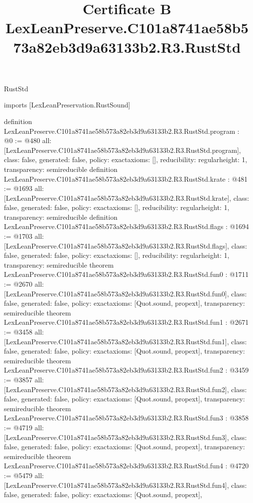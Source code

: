 \begin{lexlean}{RustStd}
\title{Certificate B LexLeanPreserve.C101a8741ae58b573a82eb3d9a63133b2.R3.RustStd}
\begin{coremodule}
imports [LexLeanPreservation.RustSound]

definition LexLeanPreserve.C101a8741ae58b573a82eb3d9a63133b2.R3.RustStd.program : @0 := @480 {
  all: [LexLeanPreserve.C101a8741ae58b573a82eb3d9a63133b2.R3.RustStd.program],
  class: false,
  generated: false,
  policy: exact{axioms: []},
  reducibility: regular{height: 1},
  transparency: semireducible
}
definition LexLeanPreserve.C101a8741ae58b573a82eb3d9a63133b2.R3.RustStd.krate : @481 := @1693 {
  all: [LexLeanPreserve.C101a8741ae58b573a82eb3d9a63133b2.R3.RustStd.krate],
  class: false,
  generated: false,
  policy: exact{axioms: []},
  reducibility: regular{height: 1},
  transparency: semireducible
}
definition LexLeanPreserve.C101a8741ae58b573a82eb3d9a63133b2.R3.RustStd.flags : @1694 := @1703 {
  all: [LexLeanPreserve.C101a8741ae58b573a82eb3d9a63133b2.R3.RustStd.flags],
  class: false,
  generated: false,
  policy: exact{axioms: []},
  reducibility: regular{height: 1},
  transparency: semireducible
}
theorem LexLeanPreserve.C101a8741ae58b573a82eb3d9a63133b2.R3.RustStd.fun0 : @1711 := @2670 {
  all: [LexLeanPreserve.C101a8741ae58b573a82eb3d9a63133b2.R3.RustStd.fun0],
  class: false,
  generated: false,
  policy: exact{axioms: [Quot.sound, propext]},
  transparency: semireducible
}
theorem LexLeanPreserve.C101a8741ae58b573a82eb3d9a63133b2.R3.RustStd.fun1 : @2671 := @3458 {
  all: [LexLeanPreserve.C101a8741ae58b573a82eb3d9a63133b2.R3.RustStd.fun1],
  class: false,
  generated: false,
  policy: exact{axioms: [Quot.sound, propext]},
  transparency: semireducible
}
theorem LexLeanPreserve.C101a8741ae58b573a82eb3d9a63133b2.R3.RustStd.fun2 : @3459 := @3857 {
  all: [LexLeanPreserve.C101a8741ae58b573a82eb3d9a63133b2.R3.RustStd.fun2],
  class: false,
  generated: false,
  policy: exact{axioms: [Quot.sound, propext]},
  transparency: semireducible
}
theorem LexLeanPreserve.C101a8741ae58b573a82eb3d9a63133b2.R3.RustStd.fun3 : @3858 := @4719 {
  all: [LexLeanPreserve.C101a8741ae58b573a82eb3d9a63133b2.R3.RustStd.fun3],
  class: false,
  generated: false,
  policy: exact{axioms: [Quot.sound, propext]},
  transparency: semireducible
}
theorem LexLeanPreserve.C101a8741ae58b573a82eb3d9a63133b2.R3.RustStd.fun4 : @4720 := @5479 {
  all: [LexLeanPreserve.C101a8741ae58b573a82eb3d9a63133b2.R3.RustStd.fun4],
  class: false,
  generated: false,
  policy: exact{axioms: [Quot.sound, propext]},
}
\end{coremodule}
\end{lexlean}

